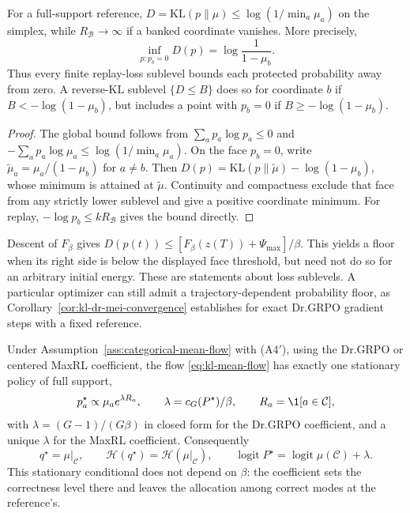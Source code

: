 \begin{lemma}
\enforcehalffinalproseline
\label{lem:kl-no-barrier}
For a full-support reference,
$D=\mathrm{KL}(p\|\mu)\le\log(1/\min_a\mu_a)$ on the simplex, while
$R_{\mathcal B}\to\infty$ if a banked coordinate vanishes. More precisely,
\[
 \inf_{p:p_b=0}D(p)=\log\frac1{1-\mu_b}.
\]
Thus every finite replay-loss sublevel bounds each protected probability
away from zero. A reverse-KL sublevel $\{D\le B\}$ does so for coordinate $b$
if $B<-\log(1-\mu_b)$, but includes a point with $p_b=0$ if
$B\ge-\log(1-\mu_b)$.
\end{lemma}
\begin{proof}
\enforcehalffinalproseline
The global bound follows from $\sum_ap_a\log p_a\le0$ and
$-\sum_ap_a\log\mu_a\le\log(1/\min_a\mu_a)$.
On the face $p_b=0$, write $\widetilde\mu_a=\mu_a/(1-\mu_b)$ for $a\ne b$.
Then $D(p)=\mathrm{KL}(p\|\widetilde\mu)-\log(1-\mu_b)$, whose minimum is
attained at $\widetilde\mu$. Continuity and compactness exclude that face
from any strictly lower sublevel and give a positive coordinate minimum.
For replay, $-\log p_b\le kR_{\mathcal B}$ gives the bound directly.
\end{proof}

Descent of $F_\beta$ gives
$D(p(t))\le [F_\beta(z(T))+\Psi_{\max}]/\beta$.
This yields a floor when its right side is below the displayed face
threshold, but need not do so for an arbitrary initial energy. These are statements about loss sublevels. A particular optimizer can still
admit a trajectory-dependent probability floor, as
Corollary~\ref{cor:kl-dr-mei-convergence} establishes for exact Dr.GRPO
gradient steps with a fixed reference.

\begin{proposition}
\enforcehalffinalproseline
\label{prop:kl-stationary}
Under Assumption~\ref{ass:categorical-mean-flow} with (A4$'$), using the
Dr.GRPO or centered MaxRL coefficient, the flow
\eqref{eq:kl-mean-flow} has exactly one stationary policy of full support,
\[
  p^\star_a\propto\mu_ae^{\lambda R_a},
  \qquad
  \lambda=c_G(P^\star)/\beta,
  \qquad
  R_a=\1[a\in\mathcal C],
\]
with $\lambda=(G-1)/(G\beta)$ in closed form for the Dr.GRPO coefficient, and
a unique $\lambda$ for the MaxRL coefficient. Consequently
\[
  q^\star=\mu|_{\mathcal C},
  \qquad
  \mathcal H(q^\star)=\mathcal H(\mu|_{\mathcal C}),
  \qquad
  \operatorname{logit}P^\star=\operatorname{logit}\mu(\mathcal C)+\lambda .
\]
This stationary conditional does not depend on $\beta$: the coefficient sets
the correctness level there and leaves the allocation among correct modes at
the reference's.
\end{proposition}

